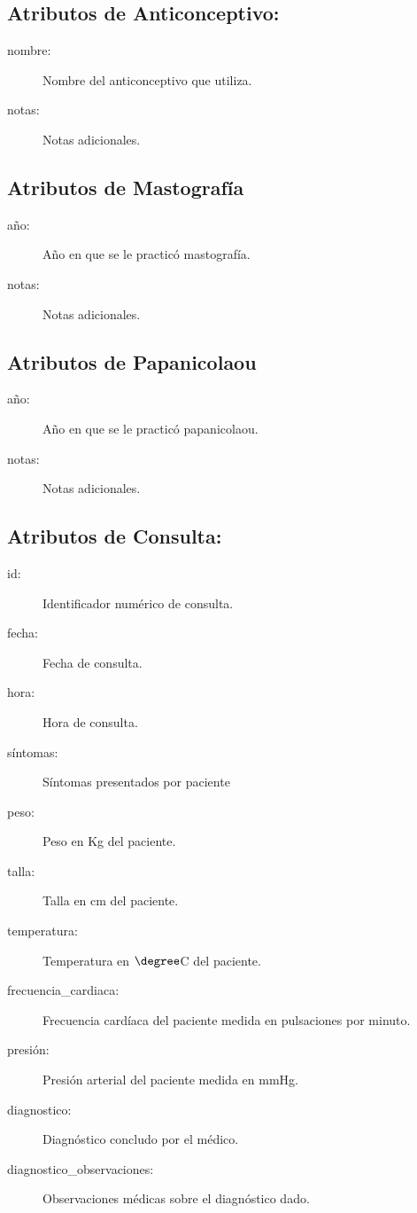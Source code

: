 \subsection{Atributos de Anticonceptivo:}
\begin{description}
\item[nombre: ]Nombre del anticonceptivo que utiliza.
\item[notas: ]Notas adicionales.
\end{description}

\subsection{Atributos de Mastografía}
\begin{description}
\item[año: ]Año en que se le practicó mastografía.
\item[notas: ]Notas adicionales.
\end{description}

\subsection{Atributos de Papanicolaou}
\begin{description}
\item[año: ]Año en que se le practicó papanicolaou.
\item[notas: ]Notas adicionales.
\end{description}

\subsection{Atributos de Consulta:}
\begin{description}
\item[id: ]Identificador numérico de consulta.
\item[fecha: ]Fecha de consulta.
\item[hora: ]Hora de consulta.
\item[síntomas: ]Síntomas presentados por paciente
\item[peso: ]Peso en Kg  del paciente.
\item[talla: ]Talla en cm del paciente.
\item[temperatura: ]Temperatura en $\degree$C del paciente.
\item[frecuencia\_cardiaca: ]Frecuencia cardíaca del paciente medida en pulsaciones por minuto.
\item[presión: ]Presión arterial del paciente medida en mmHg.
\item[diagnostico: ]Diagnóstico concludo por el médico.
\item[diagnostico\_observaciones: ]Observaciones médicas sobre el diagnóstico dado.
\end{description}


